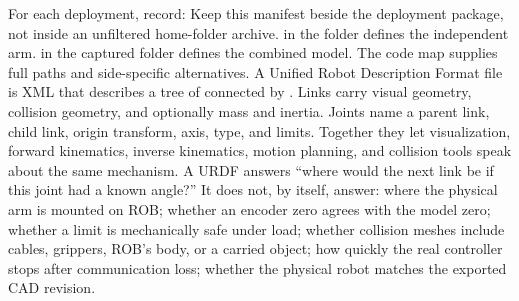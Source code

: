 {}\markdownRendererSectionBegin
{}\markdownRendererInterblockSeparator
{}For each deployment, record:\markdownRendererInterblockSeparator
{}\markdownRendererInterblockSeparator
{}Keep this manifest beside the deployment package, not inside an unfiltered home-folder archive.\markdownRendererInterblockSeparator
{}
\markdownRendererSectionEnd 
\markdownRendererSectionEnd \markdownRendererSectionBegin
{}\markdownRendererInterblockSeparator
{}\markdownRendererBlockQuoteBegin
{}  in the  folder defines the independent arm.  in the captured  folder defines the combined model. The code map supplies full paths and side-specific alternatives.\markdownRendererBlockQuoteEnd \markdownRendererInterblockSeparator
{}A Unified Robot Description Format file is XML that describes a tree of  connected by . Links carry visual geometry, collision geometry, and optionally mass and inertia. Joints name a parent link, child link, origin transform, axis, type, and limits. Together they let visualization, forward kinematics, inverse kinematics, motion planning, and collision tools speak about the same mechanism.\markdownRendererParagraphSeparator
{}A URDF answers “where would the next link be if this joint had a known angle?” It does not, by itself, answer:\markdownRendererInterblockSeparator
{}\markdownRendererUlBegin
\markdownRendererUlItem where the physical arm is mounted on ROB;\markdownRendererUlItemEnd 
\markdownRendererUlItem whether an encoder zero agrees with the model zero;\markdownRendererUlItemEnd 
\markdownRendererUlItem whether a limit is mechanically safe under load;\markdownRendererUlItemEnd 
\markdownRendererUlItem whether collision meshes include cables, grippers, ROB's body, or a carried object;\markdownRendererUlItemEnd 
\markdownRendererUlItem how quickly the real controller stops after communication loss;\markdownRendererUlItemEnd 
\markdownRendererUlItem whether the physical robot matches the exported CAD revision.\markdownRendererUlItemEnd 
\markdownRendererUlEnd \markdownRendererInterblockSeparator
